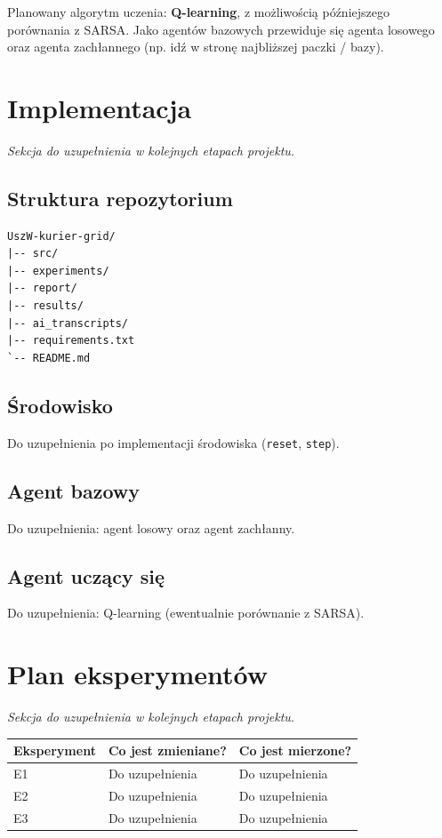 \documentclass[12pt]{article}
\begin{document}
Planowany algorytm uczenia: \textbf{Q-learning}, z możliwością późniejszego porównania z SARSA.
Jako agentów bazowych przewiduje się agenta losowego oraz agenta zachłannego
(np. idź w stronę najbliższej paczki / bazy).

\section{Implementacja}

\textit{Sekcja do uzupełnienia w kolejnych etapach projektu.}

\subsection{Struktura repozytorium}

\begin{verbatim}
UszW-kurier-grid/
|-- src/
|-- experiments/
|-- report/
|-- results/
|-- ai_transcripts/
|-- requirements.txt
`-- README.md
\end{verbatim}

\subsection{Środowisko}

Do uzupełnienia po implementacji środowiska (\texttt{reset}, \texttt{step}).

\subsection{Agent bazowy}

Do uzupełnienia: agent losowy oraz agent zachłanny.

\subsection{Agent uczący się}

Do uzupełnienia: Q-learning (ewentualnie porównanie z SARSA).

\section{Plan eksperymentów}

\textit{Sekcja do uzupełnienia w kolejnych etapach projektu.}

\begin{center}
\begin{tabular}{p{}p{}p{}}
\toprule
Eksperyment & Co jest zmieniane? & Co jest mierzone? \\
\midrule
E1 & Do uzupełnienia & Do uzupełnienia \\
E2 & Do uzupełnienia & Do uzupełnienia \\
E3 & Do uzupełnienia & Do uzupełnienia \\
\bottomrule
\end{tabular}
\end{center}
\end{document}
